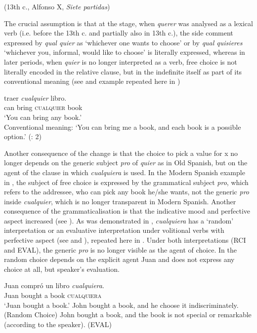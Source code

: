 {  (13th c.,}{ }{Alfonso X,} {\textit{Siete partidas}}{)}
\z

The crucial assumption is that at the stage, when \textit{querer} was analysed as a lexical verb (i.e. before the 13th c. and partially also in 13th c.), the side comment expressed by \textit{qual quier} as ‘whichever one wants to choose’ or by \textit{qual quisieres} ‘whichever you, informal, would like to choose’ is literally expressed, whereas in later periods, when \textit{quier} is no longer interpreted as a verb, free choice is not literally encoded in the relative clause, but in the indefinite itself as part of its conventional meaning (see  and example  repeated here in )

\ea \label{ex:key:314} %
   {traer} \textit{cualquier} {libro.}\\
  can bring \textsc{cualquier} book\\
  \glt ‘You can bring any book.’\\
  Conventional meaning: ‘You can bring me a book, and each book is a possible option.’
  (\citealt{AloniEtAl2011}: 2)
\z

Another consequence of the change is that the choice to pick a value for x no longer depends on the generic subject \textit{pro} of \textit{quier} as in Old Spanish, but on the agent of the clause in which \textit{cualquiera} is used. In the Modern Spanish example in , the subject of free choice is expressed by the grammatical subject \textit{pro}, which refers to the addressee, who can pick any book he/she wants, not the generic \textit{pro} inside \textit{cualquier}, which is no longer transparent in Modern Spanish. Another consequence of the grammaticalisation is that the indicative mood and perfective aspect increased (see ). As was demonstrated in , \textit{cualquiera} has a ‘random’ interpretation or an evaluative interpretation under volitional verbs with perfective aspect (see  and ), repeated here in . Under both interpretations (RCI and EVAL), the generic \textit{pro} is no longer visible as the agent of choice. In  the random choice depends on the explicit agent Juan and  does not express any choice at all, but speaker’s evaluation.

\ea \label{ex:key:315} %
  \gll Juan compró un libro \textit{cualquiera}.\\
  Juan bought a book \textsc{cualquiera}\\
  \glt ‘Juan bought a book.’
\ea  John bought a book, and he choose it indiscriminately. (Random Choice)
\ex John bought a book, and the book is not special or remarkable (according to the speaker). (EVAL)

